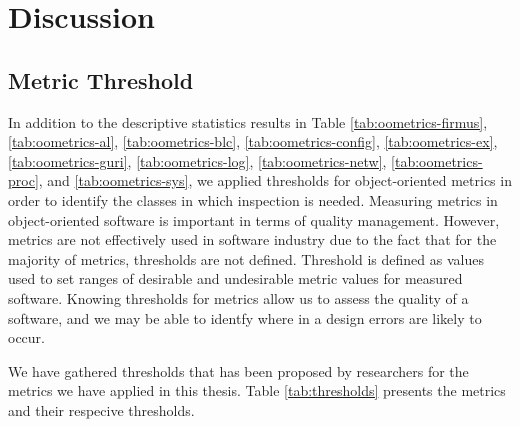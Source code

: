 
\chapter{Discussion}

\section{Metric Threshold}
In addition to the descriptive statistics results in Table \ref{tab:oometrics-firmus}, \ref{tab:oometrics-al}, \ref{tab:oometrics-blc}, \ref{tab:oometrics-config}, \ref{tab:oometrics-ex}, \ref{tab:oometrics-guri}, \ref{tab:oometrics-log}, \ref{tab:oometrics-netw}, \ref{tab:oometrics-proc}, and \ref{tab:oometrics-sys}, we applied thresholds for object-oriented metrics in order to identify the classes in which inspection is needed. Measuring metrics in object-oriented software is important in terms of quality management\cite{tarcisio,ferreira2012identifying}. However, metrics are not effectively used in software industry due to the fact that for the majority of metrics, thresholds are not defined\cite{tarcisio}. Threshold is defined as values used to set ranges of desirable and undesirable metric values for measured software\cite{ferreira2012identifying}. Knowing thresholds for metrics allow us to assess the quality of a software, and we may be able to identfy where in a design errors are likely to occur. 

We have gathered thresholds that has been proposed by researchers for the metrics we have applied in this thesis. Table \ref{tab:thresholds} presents the metrics and their respecive thresholds.






